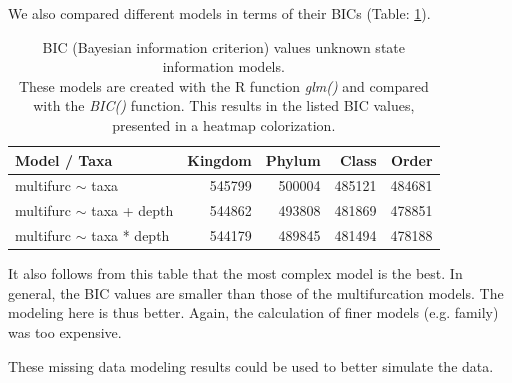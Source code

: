       We also compared different models in terms of their BICs (Table: \ref{table:BIC unknown information}). \\ 
      \begin{table}[h!]
        \begin{center}
          \begin{tabular}{ |l|r|r|r|r| }
            \hline
            \bfseries Model / Taxa & \bfseries Kingdom & \bfseries Phylum & \bfseries Class & \bfseries Order \\
            \hline \hline
            multifurc $\sim$ taxa & \cellcolor{green!15}545799 & \cellcolor{green!35}500004 & \cellcolor{green!45}485121 & \cellcolor{green!45}484681 \\
            \hline
            multifurc $\sim$ taxa + depth & \cellcolor{green!15}544862 & \cellcolor{green!40}493808 & \cellcolor{green!45}481869 & \cellcolor{green!50}478851 \\
            \hline
            multifurc $\sim$ taxa * depth & \cellcolor{green!15}544179 & \cellcolor{green!45}489845 & \cellcolor{green!45}481494 & \cellcolor{green!50}478188 \\
            \hline
          \end{tabular} 
        \end{center}
        \caption{BIC (Bayesian information criterion) values unknown state information models. \\
          These models are created with the R function \textit{glm()} and compared with the 
            \textit{BIC()} function. This results in the listed BIC values, presented in a heatmap colorization.}
        \label{table:BIC unknown information} 
      \end{table}

      It also follows from this table that the most complex model is the best. In general, the BIC 
        values are smaller than those of the multifurcation models. The modeling here is thus better.
      Again, the calculation of finer models (e.g. family) was too expensive.

      These missing data modeling results could be used to better simulate the data. \\

